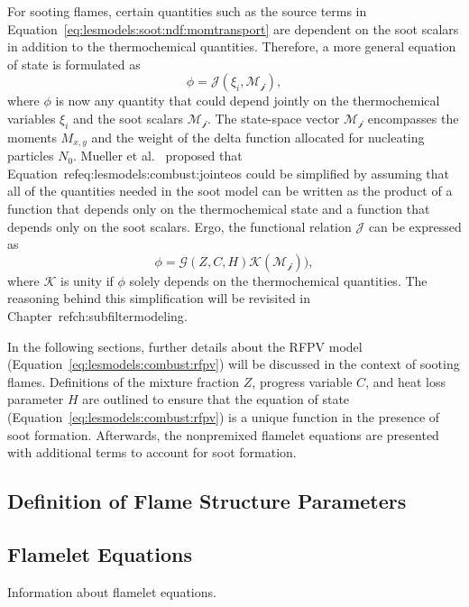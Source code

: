 For sooting flames, certain quantities such as the source terms in Equation~\ref{eq:lesmodels:soot:ndf:momtransport} are dependent on the soot scalars in addition to the thermochemical quantities. Therefore, a more general equation of state is formulated as
\begin{equation}\label{eq:lesmodels:combust:jointeos}
  \phi = \mathcal{J}(\xi_i, \mathcal{M_j}),
\end{equation}
where $\phi$ is now any quantity that could depend jointly on the thermochemical variables $\xi_i$ and the soot scalars $\mathcal{M_j}$. The state-space vector $\mathcal{M_j}$ encompasses the moments $M_{x,y}$ and the weight of the delta function allocated for nucleating particles $N_0$. Mueller et al.~\cite{subfilterpdf2011} proposed that Equation~ref{eq:lesmodels:combust:jointeos} could be simplified by assuming that all of the quantities needed in the soot model can be written as the product of a function that depends only on the thermochemical state and a function that depends only on the soot scalars. Ergo, the functional relation $\mathcal{J}$ can be expressed as
\begin{equation}\label{eq:lesmodels:combust:producteos}
  \phi = \mathcal{G}(Z, C, H)\mathcal{K}(\mathcal{M_j})),
\end{equation}
where $\mathcal{K}$ is unity if $\phi$ solely depends on the thermochemical quantities. The reasoning behind this simplification will be revisited in Chapter~ref{ch:subfiltermodeling}.

In the following sections, further details about the RFPV model (Equation~\ref{eq:lesmodels:combust:rfpv}) will be discussed in the context of sooting flames. Definitions of the mixture fraction $Z$, progress variable $C$, and heat loss parameter $H$ are outlined to ensure that the equation of state (Equation~\ref{eq:lesmodels:combust:rfpv}) is a unique function in the presence of soot formation. Afterwards, the nonpremixed flamelet equations are presented with additional terms to account for soot formation.


\subsection{Definition of Flame Structure Parameters}
\label{sec:lesmodels:combust:map}




\subsection{Flamelet Equations}
\label{sec:lesmodels:combust:flamelet}

Information about flamelet equations.
